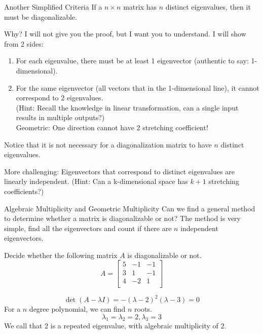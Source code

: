 \documentclass{beamer}
\begin{document}
\begin{frame}{Another Simplified Criteria}
If a $n\times n$ matrix has $n$ distinct eigenvalues, then it must be diagonalizable.

\vspace{3pt}
Why? I will not give you the proof, but I want you to understand. I will show from 2 sides:

\begin{enumerate}
    \item For each eigenvalue, there must be at least 1 eigenvector (authentic to say: 1-dimensional).
    \item For the same eigenvector (all vectors that in the 1-dimensional line), it cannot correspond to 2 eigenvalues.\\
    (Hint: Recall the knowledge in linear transformation, can a single input results in multiple outputs?)\\
    Geometric: One direction cannot have 2 stretching coefficient!
\end{enumerate}

Notice that it is not necessary for a diagonalization matrix to have $n$ distinct eigenvalues.

\vspace{3pt}
More challenging: Eigenvectors that correspond to distinct eigenvalues are linearly independent. (Hint: Can a k-dimensional space has $k+1$ stretching coefficients?)

\end{frame}

\begin{frame}{Algebraic Multiplicity and Geometric Multiplicity}
Can we find a general method to determine whether a matrix is diagonalizable or not? The method is very simple, find all the eigenvectors and count if there are $n$ independent eigenvectors.

\begin{example}
    Decide whether the following matrix $A$ is diagonalizable or not.
    \begin{equation*}
        A=\left[ \begin{matrix}
            5&		-1&		-1\\
            3&		1&		-1\\
            4&		-2&		1\\
        \end{matrix} \right]
    \end{equation*}
\end{example}
\begin{equation*}
    \det \left( A-\lambda I \right) =-\left( \lambda -2 \right) ^2\left( \lambda -3 \right)=0
\end{equation*}
For a $n$ degree polynomial, we can find $n$ roots.
\begin{equation*}
    \lambda _1=\lambda _2=2,\lambda _3=3
\end{equation*}
We call that $2$ is a repeated eigenvalue, with algebraic multiplicity of $2$.
\end{frame}
\end{document}
